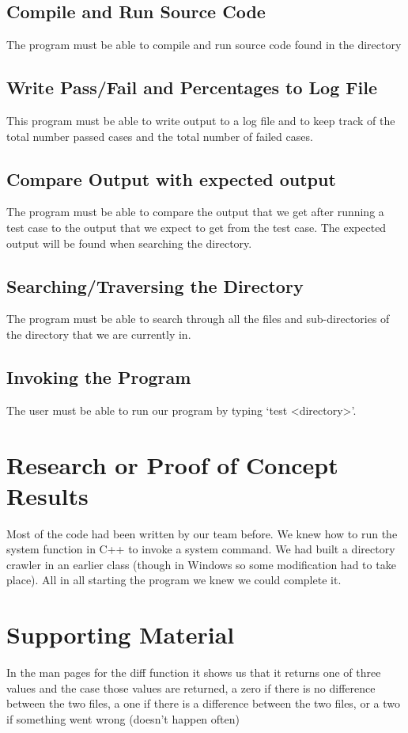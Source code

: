 \subsection{Compile and Run Source Code}
The program must be able to compile and run source code found in the directory

\subsection{Write Pass/Fail and Percentages to Log File} 
This program must be able to write output to a log file and to keep track of the total number
passed cases and the total number of failed cases.

\subsection{Compare Output with expected output}
The program must be able to compare the output that we get after running a test case to the
output that we expect to get from the test case. The expected output will be found when 
searching the directory.

\subsection{Searching/Traversing the Directory}
The program must be able to search through all the files and sub-directories of the directory 
that we are currently in.

\subsection{Invoking the Program}
The user must be able to run our program by typing `test <directory>'.


\section{Research or Proof of Concept Results}
Most of the code had been written by our team before.   We knew how to run the system 
function in C++ to invoke a system command. We had built a directory crawler in an earlier 
class (though in Windows so some modification had to take place).   All in all starting the 
program we knew we could complete it.


\section{Supporting Material}


In the man pages for the diff function it shows us that it returns one of three values and 
the case those values are returned, a zero if there is no difference between the two files, 
a one if there is a difference between the two files, or a two if something went wrong (doesn't happen often)


